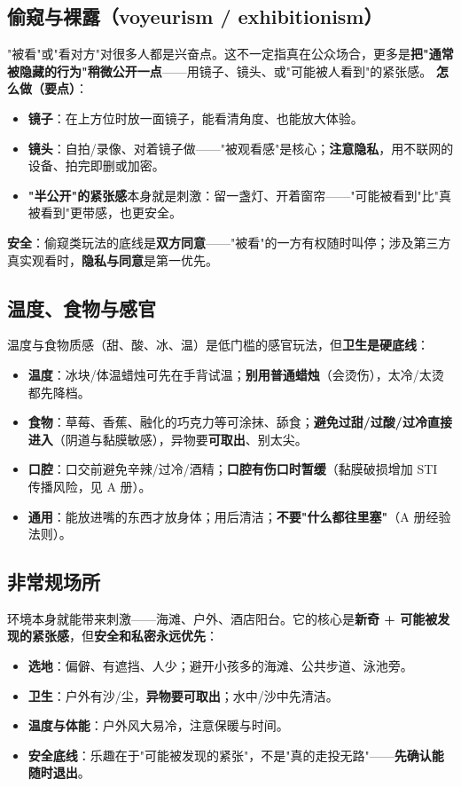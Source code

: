 \documentclass[12pt,UTF8,openany]{ctexbook}
\begin{document}
\subsection*{偷窥与裸露（voyeurism / exhibitionism）}
"被看"或"看对方"对很多人都是兴奋点。这不一定指真在公众场合，更多是\textbf{把"通常被隐藏的行为"稍微公开一点}——用镜子、镜头、或"可能被人看到"的紧张感。
\textbf{怎么做（要点）}：
\begin{itemize}[leftmargin=2em,itemsep=0.3em]
  \item \textbf{镜子}：在上方位时放一面镜子，能看清角度、也能放大体验。
  \item \textbf{镜头}：自拍/录像、对着镜子做——"被观看感"是核心；\textbf{注意隐私}，用不联网的设备、拍完即删或加密。
  \item \textbf{"半公开"的紧张感}本身就是刺激：留一盏灯、开着窗帘——"可能被看到"比"真被看到"更带感，也更安全。
\end{itemize}
\textbf{安全}：偷窥类玩法的底线是\textbf{双方同意}——"被看"的一方有权随时叫停；涉及第三方真实观看时，\textbf{隐私与同意}是第一优先。
\subsection*{温度、食物与感官}
温度与食物质感（甜、酸、冰、温）是低门槛的感官玩法，但\textbf{卫生是硬底线}：
\begin{itemize}[leftmargin=2em,itemsep=0.3em]
  \item \textbf{温度}：冰块/体温蜡烛可先在手背试温；\textbf{别用普通蜡烛}（会烫伤），太冷/太烫都先降档。
  \item \textbf{食物}：草莓、香蕉、融化的巧克力等可涂抹、舔食；\textbf{避免过甜/过酸/过冷直接进入}（阴道与黏膜敏感），异物要\textbf{可取出}、别太尖。
  \item \textbf{口腔}：口交前避免辛辣/过冷/酒精；\textbf{口腔有伤口时暂缓}（黏膜破损增加 STI 传播风险，见 A 册）。
  \item \textbf{通用}：能放进嘴的东西才放身体；用后清洁；\textbf{不要"什么都往里塞"}（A 册经验法则）。
\end{itemize}
\subsection*{非常规场所}
环境本身就能带来刺激——海滩、户外、酒店阳台。它的核心是\textbf{新奇 + 可能被发现的紧张感}，但\textbf{安全和私密永远优先}：
\begin{itemize}[leftmargin=2em,itemsep=0.3em]
  \item \textbf{选地}：偏僻、有遮挡、人少；避开小孩多的海滩、公共步道、泳池旁。
  \item \textbf{卫生}：户外有沙/尘，\textbf{异物要可取出}；水中/沙中先清洁。
  \item \textbf{温度与体能}：户外风大易冷，注意保暖与时间。
  \item \textbf{安全底线}：乐趣在于"可能被发现的紧张"，不是"真的走投无路"——\textbf{先确认能随时退出}。
\end{itemize}
\end{document}
